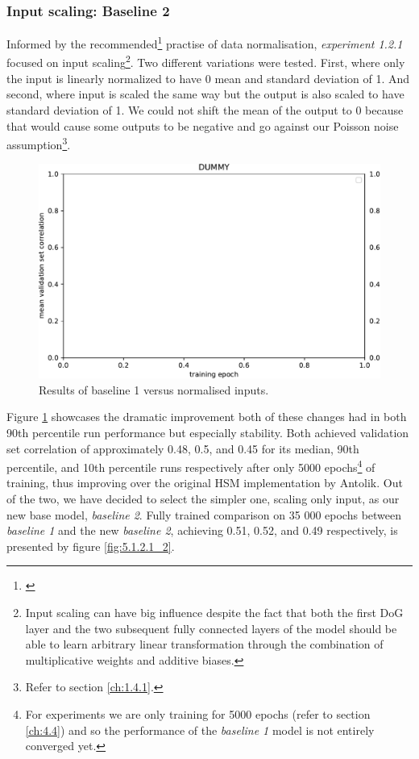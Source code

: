 \subsubsection{Input scaling: Baseline 2}
Informed by the recommended\footnote{\cite{10.5555/645754.668382}} practise of data normalisation, \emph{experiment 1.2.1} focused on input scaling\footnote{Input scaling can have big influence despite the fact that both the first DoG layer and the two subsequent fully connected layers of the model should be able to learn arbitrary linear transformation through the combination of multiplicative weights and additive biases.}. Two different variations were tested. First, where only the input is linearly normalized to have 0 mean and standard deviation of 1. And second, where input is scaled the same way but the output is also scaled to have standard deviation of 1. We could not shift the mean of the output to 0 because that would cause some outputs to be negative and go against our Poisson noise assumption\footnote{Refer to section \ref{ch:1.4.1}.}.

\begin{figure}[H]
    \centering
    \includegraphics[width=1\textwidth]{../figures/05_dummy}
    \caption[Experiment 5.1.2.1]{Results of baseline 1 versus normalised inputs\protect\footnotemark.}
    \label{fig:5.1.2.1}
\end{figure}

Figure \ref{fig:5.1.2.1} showcases the dramatic improvement both of these changes had in both 90th percentile run performance but especially stability. Both achieved validation set correlation of approximately 0.48, 0.5, and 0.45 for its median, 90th percentile, and 10th percentile runs respectively after only 5000 epochs\footnote{For experiments we are only training for 5000 epochs (refer to section  \ref{ch:4.4}) and so the performance of the \emph{baseline 1} model is not entirely converged yet.} of training, thus improving over the original HSM implementation by Antolik. Out of the two, we have decided to select the simpler one, scaling only input, as our new base model, \emph{baseline 2}. Fully trained comparison on 35 000 epochs between \emph{baseline 1} and the new \emph{baseline 2}, achieving 0.51, 0.52, and 0.49 respectively, is presented by figure \ref{fig:5.1.2.1_2}.

